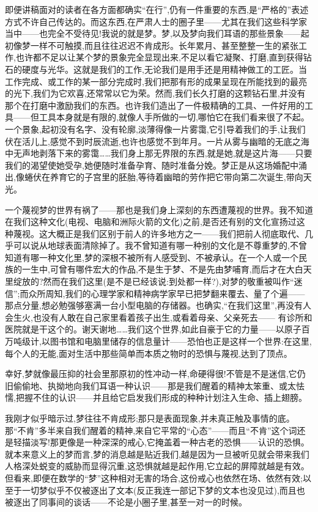 即便讲稿面对的读者在各方面都确实“在行”,仍有一件重要的东西,是“严格的”表述方式不许自己传达的。而这东西,在严肃人士的圈子里——尤其在我们这些科学家当中——也完全不受待见!我说的就是梦。梦,以及梦向我们耳语的那些景象——起初像梦一样不可触摸,而且往往迟迟不肯成形。长年累月、甚至整整一生的紧张工作,也许都不足以让某个梦的景象完全显现出来,不足以看它凝聚、打磨,直到获得钻石的硬度与光华。这就是我们的工作,无论我们是用手还是用精神做工的工匠。当工作完成、或工作的某一部分完成时,我们把那有形的成果呈现在所能找到的最亮的光下,我们为它欢喜,还常常以它为荣。然而,我们长久打磨的这颗钻石里,并没有那个在打磨中激励我们的东西。也许我们造出了一件极精确的工具、一件好用的工具——但工具本身就是有限的,就像人手所做的一切,哪怕它在我们看来很了不起。一个景象,起初没有名字、没有轮廓,淡薄得像一片雾霭,它引导着我们的手,让我们伏在活儿上,感觉不到时辰流逝,也许也感觉不到年月。一片从雾与幽暗的无底之海中无声地剥落下来的雾霭……我们身上那无界限的东西,就是她,就是这片海——只要我们的渴望使她受孕,她便随时准备孕育、随时准备分娩。梦正是从这场婚配中涌出,像蜷伏在养育它的子宫里的胚胎,等待着幽暗的劳作把它带向第二次诞生,带向天光。

一个蔑视梦的世界有祸了——那也是我们身上深刻的东西遭蔑视的世界。我不知道在我们这种文化(电视、电脑和洲际火箭的文化)之前,是否还有别的文化宣扬过这种蔑视。这大概正是我们区别于前人的许多地方之一——我们把前人彻底取代、几乎可以说从地球表面清除掉了。我不曾知道有哪一种别的文化是不尊重梦的,不曾知道有哪一种文化里,梦的深根不被所有人感受到、不被承认。在一个人或一个民族的一生中,可曾有哪件宏大的作品,不是生于梦、不是先由梦哺育,而后才在大白天里绽放的?然而在我们这里(是不是已经该说:到处都一样?),对梦的敬重被叫作“迷信”;而众所周知,我们的心理学家和精神病学家早已把梦翻来覆去、量了个遍——那点分量,想必勉强够塞满一台小型电脑的存储器。也确实,“在我们这里”,再没有人会生火,也没有人敢在自己家里看着孩子出生,或看着母亲、父亲死去——
有诊所和医院就是干这个的。谢天谢地……我们这个世界,如此自豪于它的力量——以原子百万吨级计,以图书馆和电脑里储存的信息量计——恐怕也正是这样一个世界:在这里,每个人的无能,面对生活中那些简单而本质之物时的恐惧与蔑视,达到了顶点。

 幸好,梦就像最压抑的社会里那原初的性冲动一样,命硬得很!不管是不是迷信,它仍旧偷偷地、执拗地向我们耳语一种认识——那是我们醒着的精神太笨重、或太怯懦,把握不住的认识——并且给它启发我们形成的种种计划注入生命、插上翅膀。

我刚才似乎暗示过,梦往往不肯成形;那只是表面现象,并未真正触及事情的底。那“不肯”多半来自我们醒着的精神,来自它平常的“心态”——而且“不肯”这个词还是轻描淡写!那更像是一种深深的戒心,它掩盖着一种古老的恐惧——认识的恐惧。就本来意义上的梦而言,梦的消息越是贴近我们,越是因为一旦被听见就会带来我们人格深处蜕变的威胁而显得沉重,这恐惧就越是起作用,它立起的屏障就越是有效。但看来,即便在数学的“梦”这种相对无害的场合,这份戒心也依然在场、依然有效;以至于一切梦似乎不仅被逐出了文本(反正我连一部记下梦的文本也没见过),而且也被逐出了同事间的谈话——不论是小圈子里,甚至一对一的时候。

